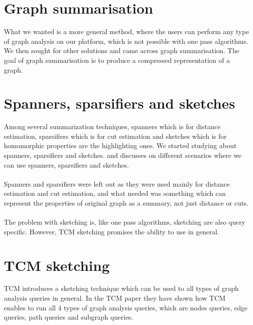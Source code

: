 \documentclass[12pt]{report}
\numberwithin{figure}{section}
\numberwithin{table}{section}
\begin{document}
\section{Graph summarisation}

What we wanted is a more general method, where the users can perform any type of graph analysis on our platform, which is not possible with one pass algorithms. We then sought for other solutions and came across graph summarisation. The goal of graph summarisation is to produce a compressed representation of a graph. 

\section{Spanners, sparsifiers and sketches}

Among several summarization techniques, spanners which is for distance estimation, sparsifiers which is for cut estimation and sketches which is for homomorphic properties are the highlighting ones. We started studying about spanners, sparsifiers and sketches. \cite{Graph sketches} and \cite{Graph stream algorithms survey} discusses on different scenarios where we can use spanners, sparsifiers and sketches.

\paragraph{}

Spanners and sparsifiers were left out as they were used mainly for distance estimation and cut estimation, and what needed was something which can represent the properties of original graph as a summary, not just distance or cuts.

\paragraph{}

The problem with sketching is, like one pass algorithms, sketching are also query specific. However, TCM sketching promises the ability to use in general. 

\section{TCM sketching}

TCM introduces a sketching technique which can be used to all types of graph analysis queries in general. In the TCM paper they have shown how TCM enables to run all 4 types of graph analysis queries, which are nodes queries, edge queries, path queries and subgraph queries. 
\end{document}
